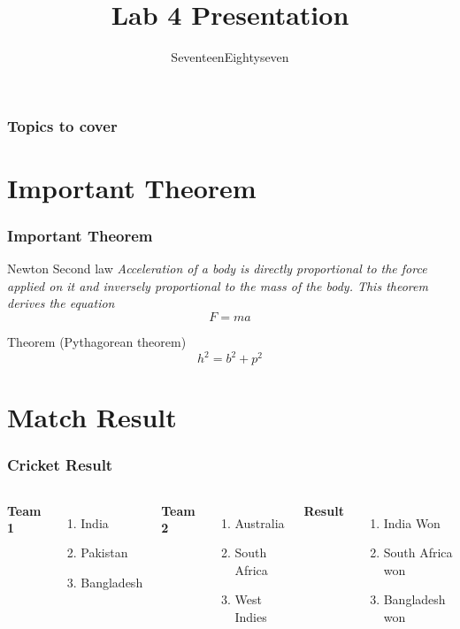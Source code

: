 \documentclass[]{beamer}
\title[]{Lab 4 Presentation}
\author{SeventeenEightyseven}
\institute{IIT Bombay}
\begin{document}
\begin{frame}

\titlepage

\end{frame}

\begin{frame}
\frametitle{Topics to cover}
\tableofcontents
\end{frame}

\section{Important Theorem}
\begin{frame}
\frametitle{Important Theorem}
\begin{block}{Newton Second law \footnotemark}
\emph{
Acceleration of a body is directly proportional to the force applied
on it and inversely proportional to the mass of the body. This
theorem derives the equation}
$$F=ma$$
\end{block}
\pause
\begin{exampleblock}{Theorem (Pythagorean theorem)}
$$h^2=b^2+p^2$$
\end{exampleblock}
\end{frame}


\section{Match Result}
\begin{frame}
\frametitle{Cricket Result}
\begin{columns}
\textbf{Team 1}
\begin{enumerate}
\item India
\item Pakistan
\item Bangladesh
\end{enumerate}
\textbf{Team 2}
\begin{enumerate}
\item Australia
\item South Africa
\item West Indies
\end{enumerate}
\textbf{Result}
\begin{enumerate}
\item India Won
\item South Africa won
\item Bangladesh won
\end{enumerate}
\end{columns}
\end{frame}
\end{document}
